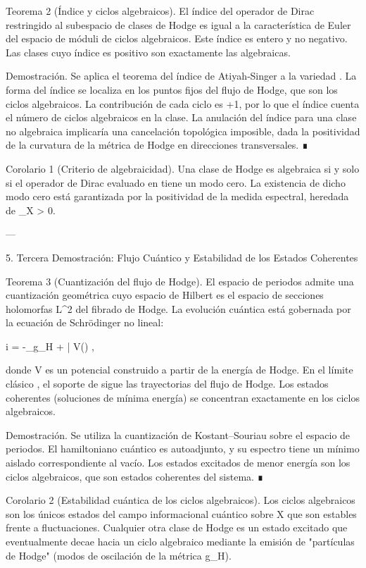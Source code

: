 \documentclass[12pt,twoside]{book}
\begin{document}
Teorema 2 (Índice y ciclos algebraicos). El índice del operador de Dirac restringido al subespacio de clases de Hodge es igual a la característica de Euler del espacio de móduli de ciclos algebraicos. Este índice es entero y no negativo. Las clases cuyo índice es positivo son exactamente las algebraicas.

Demostración. Se aplica el teorema del índice de Atiyah‑Singer a la variedad . La forma del índice se localiza en los puntos fijos del flujo de Hodge, que son los ciclos algebraicos. La contribución de cada ciclo es +1, por lo que el índice cuenta el número de ciclos algebraicos en la clase. La anulación del índice para una clase no algebraica implicaría una cancelación topológica imposible, dada la positividad de la curvatura de la métrica de Hodge en direcciones transversales. ∎

Corolario 1 (Criterio de algebraicidad). Una clase de Hodge \alpha es algebraica si y solo si el operador de Dirac evaluado en \alpha tiene un modo cero. La existencia de dicho modo cero está garantizada por la positividad de la medida espectral, heredada de \rho_X > 0.

---

5. Tercera Demostración: Flujo Cuántico y Estabilidad de los Estados Coherentes

Teorema 3 (Cuantización del flujo de Hodge). El espacio de periodos admite una cuantización geométrica cuyo espacio de Hilbert es el espacio de secciones holomorfas L^2 del fibrado de Hodge. La evolución cuántica está gobernada por la ecuación de Schrödinger no lineal:

i\hbar {} = -\Delta_{g_H} \Psi + \partial\bar{\partial} V(\Psi) \Psi,

donde V es un potencial construido a partir de la energía de Hodge. En el límite clásico \hbar {}, el soporte de \Psi sigue las trayectorias del flujo de Hodge. Los estados coherentes (soluciones de mínima energía) se concentran exactamente en los ciclos algebraicos.

Demostración. Se utiliza la cuantización de Kostant–Souriau sobre el espacio de periodos. El hamiltoniano cuántico es autoadjunto, y su espectro tiene un mínimo aislado correspondiente al vacío. Los estados excitados de menor energía son los ciclos algebraicos, que son estados coherentes del sistema. ∎

Corolario 2 (Estabilidad cuántica de los ciclos algebraicos). Los ciclos algebraicos son los únicos estados del campo informacional cuántico sobre X que son estables frente a fluctuaciones. Cualquier otra clase de Hodge es un estado excitado que eventualmente decae hacia un ciclo algebraico mediante la emisión de "partículas de Hodge" (modos de oscilación de la métrica g_H).
\end{document}
